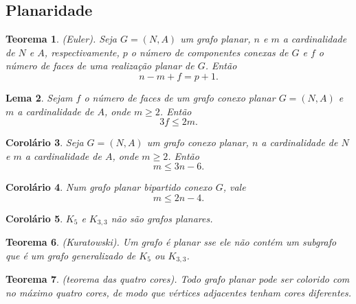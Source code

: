 \documentclass{article}
\theoremstyle{plain}
\newtheorem{thm}{Teorema}[section]
\newtheorem{lem}[thm]{Lema}
\newtheorem{cor}[thm]{Corolário}
\theoremstyle{definition}
\theoremstyle{remark}
\begin{document}
\subsection{Planaridade}

\begin{thm} (Euler).
    Seja \(G = (N, A)\) um grafo planar, \(n\) e \(m\) a cardinalidade de \(N\) e \(A\), respectivamente, \(p\) o número de componentes conexas de \(G\) e \(f\) o número de faces de uma realização planar de \(G\). Então 
    \begin{equation}
        n - m + f = p + 1.
    \end{equation}
\end{thm}

\begin{lem}
    Sejam \(f\) o número de faces de um grafo conexo planar \(G = (N, A)\) e \(m\) a cardinalidade de \(A\), onde \(m \geq 2\). Então 
    \begin{equation}
        3f \leq 2m.
    \end{equation}
\end{lem}

\begin{cor}
    Seja \(G = (N, A)\) um grafo conexo planar, \(n\) a cardinalidade de \(N\) e \(m\) a cardinalidade de \(A\), onde \(m \geq 2\). Então
    \begin{equation}
        m \leq 3n - 6.
    \end{equation}
\end{cor}

\begin{cor}
    Num grafo planar bipartido conexo \(G\), vale 
    \begin{equation}
        m \leq 2n - 4.
    \end{equation}
\end{cor}

\begin{cor}
    \(K_5\) e \(K_{3,3}\) não são grafos planares.
\end{cor}

\begin{thm} (Kuratowski).
    Um grafo é planar sse ele não contém um subgrafo que é um grafo generalizado de \(K_5\) ou \(K_{3,3}\).
\end{thm}

\begin{thm} (teorema das quatro cores).
    Todo grafo planar pode ser colorido com no máximo quatro cores, de modo que vértices adjacentes tenham cores diferentes.
\end{thm}
\end{document}
